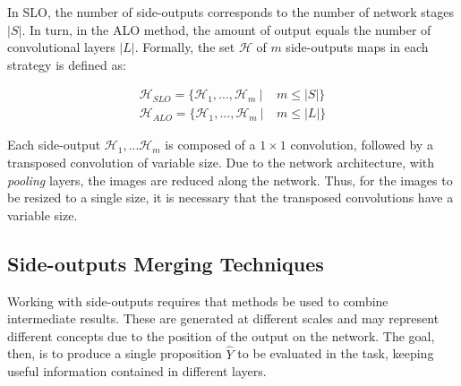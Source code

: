 % 

In SLO, the number of side-outputs corresponds to the number of network stages $|S|$.
In turn, in the ALO method, the amount of output equals the number of convolutional layers $|L|$.
Formally, the set $ \mathcal{H}$ of $m$ side-outputs maps in each strategy is defined as:

\begin{align}
\mathcal{H}_{SLO}=\{\mathcal{H}_1,...,\mathcal{H}_m~|&~ m \le |S|\}\\
\mathcal{H}_{ALO}=\{\mathcal{H}_1,...,\mathcal{H}_m~|&~ m \le |L|\}
\end{align}

Each side-output $\mathcal{H}_1, ... \mathcal{H}_m$ is composed of a $1 \times 1$ convolution, followed by a transposed convolution of variable size.
Due to the network architecture, with \textit{pooling} layers, the images are reduced along the network. 
Thus, for the images to be resized to a single size, it is necessary that the transposed convolutions have a variable size.

\subsection{Side-outputs Merging Techniques}
\label{cap5_func_combinar_saidas}

Working with side-outputs requires that methods be used to combine intermediate results.
These are generated at different scales and may represent different concepts due to the position of the output on the network.
The goal, then, is to produce a single proposition $\hat{Y}$ to be evaluated in the task, keeping useful information contained in different layers.

